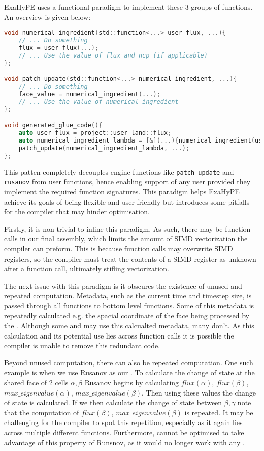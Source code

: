 ExaHyPE uses a functional paradigm to implement these 3 groups of functions.
An overview is given below:
\begin{lstlisting}[language=c]
void numerical_ingredient(std::function<...> user_flux, ...){
    // ... Do something
    flux = user_flux(...);
    // ... Use the value of flux and ncp (if applicable) 
};

void patch_update(std::function<...> numerical_ingredient, ...){
    // ... Do something
    face_value = numerical_ingredient(...);
    // ... Use the value of numerical ingredient
};

void generated_glue_code(){
    auto user_flux = project::user_land::flux;
    auto numerical_ingredient_lambda = [&](...){numerical_ingredient(user_flux, ...)};
    patch_update(numerical_ingredient_lambda, ...);
};
\end{lstlisting}
This patten completely decouples engine functions like \texttt{patch\_update} and \texttt{rusanov} from user functions, hence enabling support of any user  provided they implement the required function signatures.
This paradigm helps ExaHyPE achieve its goals of being flexible and user friendly but introduces some pitfalls for the compiler that may hinder optimisation.

Firstly, it is non-trivial to inline this paradigm.
As such, there may be function calls in our final assembly, which limits the amount of SIMD vectorization the compiler can preform.
This is because function calls may overwrite SIMD registers, so the compiler must treat the contents of a SIMD register as unknown after a function call, ultimately stifling vectorization.

The next issue with this paradigm is it obscures the existence of unused and repeated computation.
Metadata, such as the current time and timestep size, is passed through all functions to bottom level  functions.
Some of this metadata is repeatedly calculated e.g. the spacial coordinate of the face being processed by the .
Although some  and  may use this calcualted metadata, many don't.
As this calculation and its potential use lies across function calls it is possible the compiler is unable to remove this redundant code.

Beyond unused computation, there can also be repeated computation.
One such example is when we use Rusanov as our .
To calculate the change of state at the shared face of 2 cells $\alpha,\beta$ Rusanov begins by calculating $flux(\alpha)$, $flux(\beta)$, $max\_eigenvalue(\alpha)$, $max\_eigenvalue(\beta)$.
Then using these values the change of state is calculated.
If we then calculate the change of state between $\beta,\gamma$ note that the computation of $flux(\beta)$, $max\_eigenvalue(\beta)$ is repeated.
It may be challenging for the compiler to spot this repetition, especially as it again lies across multiple different functions.
Furthermore,  cannot be optimised to take advantage of this property of Runsnov, as it would no longer work with any .



